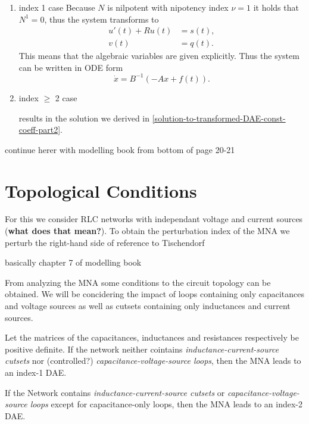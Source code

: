 \begin{enumerate}
	\item index 1 case
	Because $N$ is nilpotent with nipotency index $\nu = 1$ it holds that $N^1 = 0$, thus the system transforms to
	\begin{align*}
		u'(t) + Ru(t) &= s(t), \\
		v(t) &= q(t).
	\end{align*}
	This means that the algebraic variables are given explicitly. Thus the system can be written in ODE form
	\begin{displaymath}
		\dot{x}=B^{-1}(-Ax+f(t)).
	\end{displaymath}

	\item index $\geq$ 2 case
	
	results in the solution we derived in \ref{solution-to-transformed-DAE-const-coeff-part2}.
\end{enumerate}

continue herer with modelling book from bottom of page 20-21

\section{Topological Conditions}
For this we consider RLC networks with independant voltage and current sources (\textbf{what does that mean?}). To obtain the perturbation index of the MNA we perturb the right-hand side of  
\newline reference to Tischendorf

basically chapter 7 of modelling book

From analyzing the MNA some conditions to the circuit topology can be obtained. We will be concidering the impact of loops containing only capacitances and voltage sources as well as cutsets containing only inductances and current sources.

\begin{theorem} \cite{Tischendorf2004Topological}
	Let the matrices of the capacitances, inductances and resistances respectively be positive definite. If the network neither cointains \emph{inductance-current-source cutsets} nor (controlled?) \emph{capacitance-voltage-source loops}, then the MNA leads to an index-1 DAE.
\end{theorem}

\begin{theorem} \cite{Tischendorf2004Topological}
	If the Network contains \emph{inductance-current-source cutsets} or \emph{capacitance-voltage-source loops} except for capacitance-only loops, then the MNA leads to an index-2 DAE.
\end{theorem}